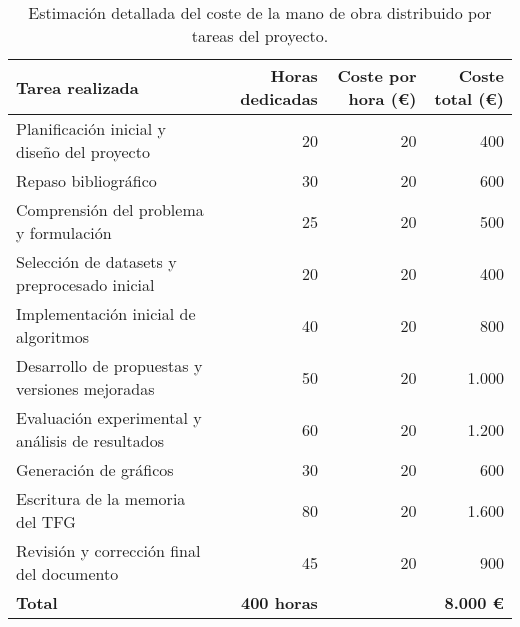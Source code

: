 \begin{table}[htp]
    \centering
    \begin{adjustbox}{width=\linewidth}
        \begin{tabular}{|l|r|r|r|}
            \hline
            \textbf{Tarea realizada}                         & \textbf{Horas dedicadas} & \textbf{Coste por hora (€)} & \textbf{Coste total (€)} \\ \hline
            Planificación inicial y diseño del proyecto      & 20                       & 20                          & 400                      \\
            Repaso bibliográfico                             & 30                       & 20                          & 600                      \\
            Comprensión del problema y formulación           & 25                       & 20                          & 500                      \\
            Selección de datasets y preprocesado inicial     & 20                       & 20                          & 400                      \\
            Implementación inicial de algoritmos             & 40                       & 20                          & 800                      \\
            Desarrollo de propuestas y versiones mejoradas   & 50                       & 20                          & 1.000                    \\
            Evaluación experimental y análisis de resultados & 60                       & 20                          & 1.200                    \\
            Generación de gráficos                           & 30                       & 20                          & 600                      \\
            Escritura de la memoria del TFG                  & 80                       & 20                          & 1.600                    \\
            Revisión y corrección final del documento        & 45                       & 20                          & 900                      \\ \hline
            \textbf{Total}                                   & \textbf{400 horas}       &                             & \textbf{8.000 €}         \\ \hline
        \end{tabular}
    \end{adjustbox}
    \caption{Estimación detallada del coste de la mano de obra distribuido por tareas del proyecto.}
    \label{tab:mano-de-obra}
\end{table}



